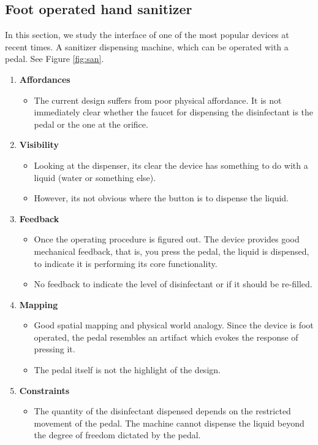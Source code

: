 \documentclass[10pt]{scrartcl}
\begin{document}
\subsection{Foot operated hand sanitizer} In this section, we study the interface of one of the most popular devices at recent times. A sanitizer dispensing machine, which can be operated with a pedal. See Figure \ref{fig:san}.

\begin{enumerate}
	\item \textbf{Affordances} 
	\begin{itemize}
	\item The current design suffers from poor physical affordance. It is not immediately clear whether the faucet for dispensing the disinfectant is the pedal or the one at the orifice.
	\end{itemize}
	\item \textbf{Visibility} 
	\begin{itemize}
		\item Looking at the dispenser, its clear the device has something to do with a liquid (water or something else). 
		\item However, its not obvious where the button is to dispense the liquid.		
	\end{itemize}
	
	\item \textbf{Feedback} 
	\begin{itemize}
		\item Once the operating procedure is figured out. The device provides good mechanical feedback, that is, you press the pedal, the liquid is dispensed, to indicate it is performing its core functionality.
		\item No feedback to indicate the level of disinfectant or if it should be re-filled.		
	\end{itemize}
	\item \textbf{Mapping} 
	\begin{itemize}
		\item Good spatial mapping and physical world analogy. Since the device is foot operated, the pedal resembles an artifact which evokes the response of pressing it.
		\item The pedal itself is not the highlight of the design.		
	\end{itemize}
	
	\item \textbf{Constraints} 
	\begin{itemize}
		\item The quantity of the disinfectant dispensed depends on the restricted movement of the pedal. The machine cannot dispense the liquid beyond the degree of freedom dictated by the pedal.	
	\end{itemize}
	

\end{enumerate}
\end{document}
